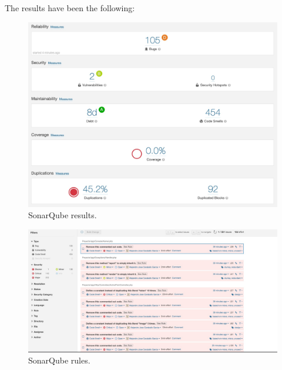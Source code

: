 \newpage
The results have been the following:
\begin{figure}[h]
	\centering
	\includegraphics[scale=0.3]{Developing/SQ1.jpeg}
	\caption{SonarQube results.}
	\label{SonarQube results}
\end{figure}
\newpage
\begin{figure}[h]
	\centering
	\includegraphics[scale=0.3]{Developing/SQ2.jpeg}
	\caption{SonarQube rules.}
	\label{SonarQube rules}
\end{figure}